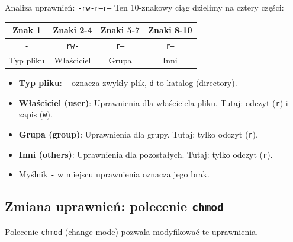 \begin{definitionbox}{Analiza uprawnień: \texttt{-rw-r--r--}}
Ten 10-znakowy ciąg dzielimy na cztery części:
\begin{center}
\begin{tabular}{|c|c|c|c|}
\hline
\textbf{Znak 1} & \textbf{Znaki 2-4} & \textbf{Znaki 5-7} & \textbf{Znaki 8-10} \\
\hline
\texttt{-} & \texttt{rw-} & \texttt{r--} & \texttt{r--} \\
\hline
Typ pliku & Właściciel & Grupa & Inni \\
\hline
\end{tabular}
\end{center}
\begin{itemize}
    \item \textbf{Typ pliku}: \texttt{-} oznacza zwykły plik, \texttt{d} to katalog (directory).
    \item \textbf{Właściciel (user)}: Uprawnienia dla właściciela pliku. Tutaj: odczyt (\texttt{r}) i zapis (\texttt{w}).
    \item \textbf{Grupa (group)}: Uprawnienia dla grupy. Tutaj: tylko odczyt (\texttt{r}).
    \item \textbf{Inni (others)}: Uprawnienia dla pozostałych. Tutaj: tylko odczyt (\texttt{r}).
    \item Myślnik \texttt{-} w miejscu uprawnienia oznacza jego brak.
\end{itemize}
\end{definitionbox}

\subsection{Zmiana uprawnień: polecenie \texttt{chmod}}
Polecenie \texttt{chmod} (change mode) pozwala modyfikować te uprawnienia.


